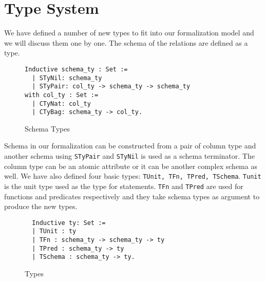 \section{Type System}
\label{sec:types}

We have defined a number of new types to fit into our formalization model and we will discuss them one by one. The schema of the relations are defined as a type.

\begin{figure}
\begin{lstlisting}
Inductive schema_ty : Set :=
  | STyNil: schema_ty
  | STyPair: col_ty -> schema_ty -> schema_ty
with col_ty : Set :=
  | CTyNat: col_ty
  | CTyBag: schema_ty -> col_ty.
\end{lstlisting}
\caption{Schema Types}
\label{fig-schema_types}
\end{figure}

Schema in our formalization can be constructed from a pair of column type and another schema using \texttt{STyPair} and \texttt{STyNil} is used as a schema terminator. The column type can be an atomic attribute or it can be another complex schema as well. We have also defined four basic types: \texttt{TUnit, TFn, TPred, TSchema}. \texttt{Tunit} is the unit type used as the type for statements. \texttt{TFn} and \texttt{TPred} are used for functions and predicates respectively and they take schema types as argument to produce the new types.

\begin{figure}
\begin{lstlisting}
  Inductive ty: Set :=
  | TUnit : ty
  | TFn : schema_ty -> schema_ty -> ty
  | TPred : schema_ty -> ty
  | TSchema : schema_ty -> ty.
\end{lstlisting}
\caption{Types}
\label{fig-types}
\end{figure}

